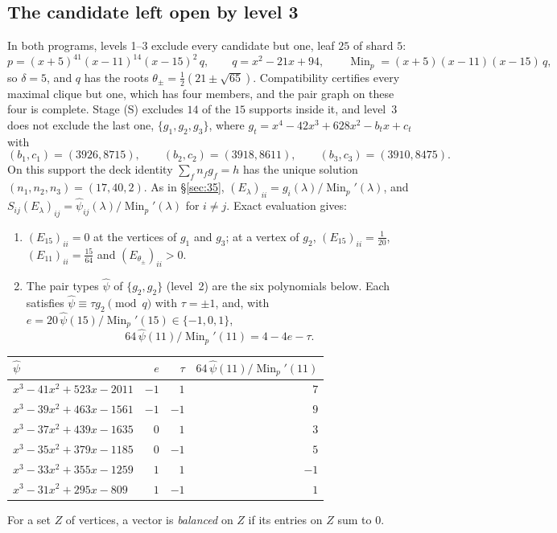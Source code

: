 \documentclass[11pt]{article}
\theoremstyle{definition}
\newcommand{\Min}{\operatorname{Min}}
\begin{document}
\subsection{The candidate left open by level 3}\label{sec:59x}
In both programs, levels 1--3 exclude every candidate but one, leaf $25$ of shard $5$:
\[
p=(x+5)^{41}(x-11)^{14}(x-15)^2\,q,\qquad q=x^2-21x+94,\qquad \Min_p=(x+5)(x-11)(x-15)\,q,
\]
so $\delta=5$, and $q$ has the roots $\theta_\pm=\frac12(21\pm\sqrt{65})$. Compatibility certifies every
maximal clique but one, which has four members, and the pair graph on these four is complete. Stage (S)
excludes $14$ of the $15$ supports inside it, and level~3 does not exclude the last one,
$\{g_1,g_2,g_3\}$, where $g_t=x^4-42x^3+628x^2-b_tx+c_t$ with
\[
(b_1,c_1)=(3926,8715),\qquad(b_2,c_2)=(3918,8611),\qquad(b_3,c_3)=(3910,8475).
\]
On this support the deck identity $\sum_fn_fg_f=h$ has the unique solution $(n_1,n_2,n_3)=(17,40,2)$.
As in \S\ref{sec:35}, $(E_\lambda)_{ii}=g_i(\lambda)/\Min_p'(\lambda)$, and
$S_{ij}(E_\lambda)_{ij}=\widehat\psi_{ij}(\lambda)/\Min_p'(\lambda)$ for $i\ne j$. Exact evaluation gives:
\begin{enumerate}
\item[(a)] $(E_{15})_{ii}=0$ at the vertices of $g_1$ and $g_3$; at a vertex of $g_2$,
$(E_{15})_{ii}=\frac1{20}$, $(E_{11})_{ii}=\frac{15}{64}$ and $(E_{\theta_\pm})_{ii}>0$.
\item[(b)] The pair types $\widehat\psi$ of $\{g_2,g_2\}$ (level~2) are the six polynomials below. Each
satisfies $\widehat\psi\equiv\tau g_2\pmod q$ with $\tau=\pm1$, and, with
$e=20\,\widehat\psi(15)/\Min_p'(15)\in\{-1,0,1\}$,
\[
64\,\widehat\psi(11)/\Min_p'(11)=4-4e-\tau.
\]
\end{enumerate}
\smallskip
\begin{center}
\begin{tabular}{lrrr}
\toprule
$\widehat\psi$ & $e$ & $\tau$ & $64\,\widehat\psi(11)/\Min_p'(11)$\\
\midrule
$x^3-41x^2+523x-2011$ & $-1$ & $1$ & $7$\\
$x^3-39x^2+463x-1561$ & $-1$ & $-1$ & $9$\\
$x^3-37x^2+439x-1635$ & $0$ & $1$ & $3$\\
$x^3-35x^2+379x-1185$ & $0$ & $-1$ & $5$\\
$x^3-33x^2+355x-1259$ & $1$ & $1$ & $-1$\\
$x^3-31x^2+295x-809$ & $1$ & $-1$ & $1$\\
\bottomrule
\end{tabular}
\end{center}
\smallskip
For a set $Z$ of vertices, a vector is \emph{balanced} on $Z$ if its entries on $Z$ sum to $0$.
\end{document}
